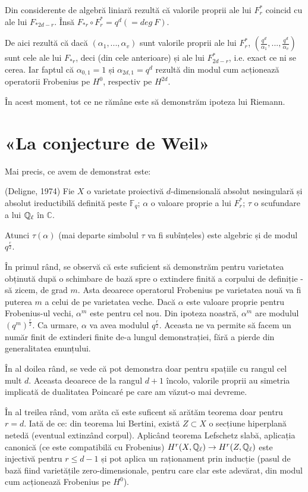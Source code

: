 \documentclass[13pt,openany]{book}
\begin{document}
Din considerente de algebră liniară rezultă că valorile proprii ale lui $F^*_r$ coincid cu ale lui $F_{*2d-r}$. Însă $F_{*r} \circ F^*_r = q^d (=deg\ F)$.

De aici rezultă că dacă $(\alpha_1,...,\alpha_v)$ sunt valorile proprii ale lui $F^*_r$, $(\frac{q^d}{\alpha_1},...,\frac{q^d}{\alpha_v})$ sunt cele ale lui $F_{*r}$, deci (din cele anterioare) și ale lui $F^*_{2d-r}$, i.e. exact ce ni se cerea. Iar faptul că $\alpha_{0,1}=1$ și $\alpha_{2d,1}=q^d$ rezultă din modul cum acționează operatorii Frobenius pe $H^0$, respectiv pe $H^{2d}$.

În acest moment, tot ce ne rămâne este să demonstrăm ipoteza lui Riemann.

\chapter{«La conjecture de Weil»}

Mai precis, ce avem de demonstrat este:

\begin{teo}
(Deligne, 1974) Fie $X$ o varietate proiectivă $d$-dimensională absolut nesingulară și absolut ireductibilă definită peste $\mathbb{F}_q$; $\alpha$ o valoare proprie a lui $F^*_r$; $\tau$ o scufundare a lui $\mathbb{Q}_\ell$ în $\mathbb{C}$.

Atunci $\tau(\alpha)$ (mai departe simbolul $\tau$ va fi subînțeles) este algebric și de modul $q^{\frac{r}{2}}$.
\end{teo}

În primul rând, se observă că este suficient să demonstrăm pentru varietatea obținută după o schimbare de bază spre o extindere finită a corpului de definiție - să zicem, de grad $m$. Asta deoarece operatorul Frobenius pe varietatea nouă va fi puterea $m$ a celui de pe varietatea veche. Dacă $\alpha$ este valoare proprie pentru Frobenius-ul vechi, $\alpha^m$ este pentru cel nou. Din ipoteza noastră, $\alpha^m$ are modulul $(q^{m})^{\frac{r}{2}}$. Ca urmare, $\alpha$ va avea modulul $q^{\frac{r}{2}}$. Aceasta ne va permite să facem un număr finit de extinderi finite de-a lungul demonstrației, fără a pierde din generalitatea enunțului.

În al doilea rând, se vede că pot demonstra doar pentru spațiile cu rangul cel mult $d$. Aceasta deoarece de la rangul $d+1$ încolo, valorile proprii au simetria implicată de dualitatea Poincaré pe care am văzut-o mai devreme.

În al treilea rând, vom arăta că este suficent să arătăm teorema doar pentru $r=d$. Iată de ce: din teorema lui Bertini, există $Z \subset X$ o secțiune hiperplană netedă (eventual extinzând corpul).  Aplicând teorema Lefschetz slabă, aplicația canonică (ce este compatibilă cu Frobenius) $H^r(X,\mathbb{Q}_\ell) \rightarrow H^r(Z,\mathbb{Q}_\ell)$ este injectivă pentru $r \leq d - 1$ și pot aplica un raționament prin inducție (pasul de bază fiind varietățile zero-dimensionale, pentru care clar este adevărat, din modul cum acționează Frobenius pe $H^0$).
\end{document}
